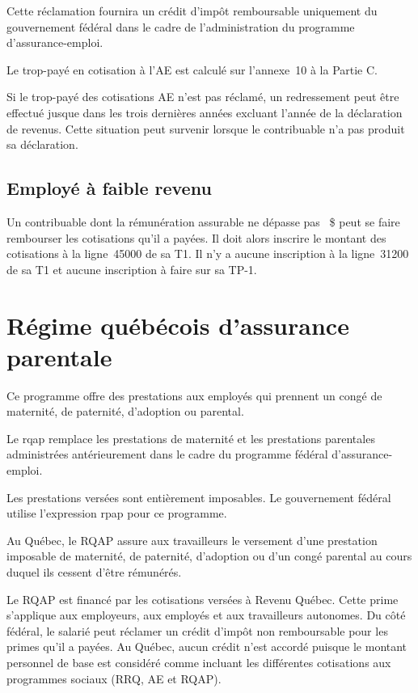 Cette réclamation fournira un crédit d'impôt remboursable uniquement du gouvernement fédéral dans le cadre de l'administration du programme d'assurance-emploi.

Le trop-payé en cotisation à l'AE est calculé sur l'annexe~10 à la Partie C.

\begin{note}
	Si le trop-payé des cotisations AE n'est pas réclamé, un redressement peut être effectué jusque dans les trois dernières années excluant l'année de la déclaration de revenus. Cette situation peut survenir lorsque le contribuable n'a pas produit sa déclaration.
\end{note}


\subsection{Employé à faible revenu}
Un contribuable dont la rémunération assurable ne dépasse pas ~\$ peut se faire rembourser les cotisations qu'il a payées. Il doit alors inscrire le montant des cotisations à la ligne~45000 de sa T1. Il n'y a aucune inscription à la ligne~31200 de sa T1 et aucune inscription à faire sur sa TP-1.



\section{Régime québécois d'assurance parentale}
\begin{intro}
	Ce programme offre des prestations aux employés qui prennent un congé de maternité, de paternité, d'adoption ou parental.
\end{intro}
Le \acrfull{rqap} remplace les prestations de maternité et les prestations parentales administrées antérieurement dans le cadre du programme fédéral d'assurance-emploi. 

Les prestations versées sont entièrement imposables. Le gouvernement fédéral utilise l'expression \acrfull{rpap} pour ce programme.

Au Québec, le RQAP assure aux travailleurs le versement d'une prestation imposable de maternité, de paternité, d'adoption ou d'un congé parental au cours duquel ils cessent d'être rémunérés.

Le RQAP est financé par les cotisations versées à Revenu Québec. Cette prime s'applique aux employeurs, aux employés et aux travailleurs autonomes. Du côté fédéral, le salarié peut réclamer un crédit d'impôt non remboursable pour les primes qu'il a payées. Au Québec, aucun crédit n'est accordé puisque le montant personnel de base est considéré comme incluant les différentes cotisations aux programmes sociaux (RRQ, AE et RQAP).



